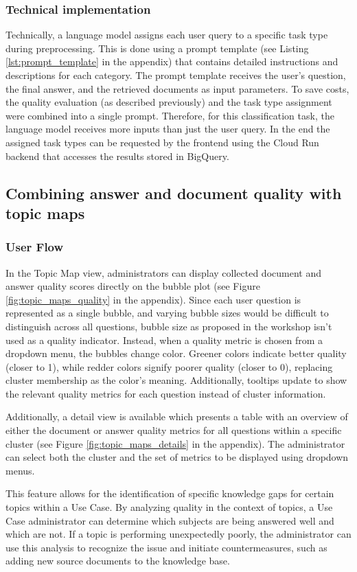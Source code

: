 \documentclass[
	english,
	ruledheaders=section,%
	class=report,%
	thesis={type=bachelor},%
	accentcolor=1b,%
	custommargins=true,%
	marginpar=false,%
	parskip=half-,%
	fontsize=11pt,%
	DIV=14,
]{tudapub}
\begin{document}
\subsubsection{Technical implementation}
Technically, a language model assigns each user query to a specific task type during preprocessing. This is done using a prompt template (see Listing \ref{lst:prompt_template} in the appendix) that contains detailed instructions and descriptions for each category. The prompt template receives the user's question, the final answer, and the retrieved documents as input parameters. To save costs, the quality evaluation (as described previously) and the task type assignment were combined into a single prompt. Therefore, for this classification task, the language model receives more inputs than just the user query. In the end the assigned task types can be requested by the frontend using the Cloud Run backend that accesses the results stored in BigQuery.
\subsection{Combining answer and document quality with topic maps}
\subsubsection{User Flow}
In the Topic Map view, administrators can display collected document and answer quality scores directly on the bubble plot (see Figure \ref{fig:topic_maps_quality} in the appendix). Since each user question is represented as a single bubble, and varying bubble sizes would be difficult to distinguish across all questions, bubble size as proposed in the workshop isn't used as a quality indicator. Instead, when a quality metric is chosen from a dropdown menu, the bubbles change color. Greener colors indicate better quality (closer to 1), while redder colors signify poorer quality (closer to 0), replacing cluster membership as the color's meaning. Additionally, tooltips update to show the relevant quality metrics for each question instead of cluster information.

Additionally, a detail view is available which presents a table with an overview of either the document or answer quality metrics for all questions within a specific cluster (see Figure  \ref{fig:topic_maps_details} in the appendix). The administrator can select both the cluster and the set of metrics to be displayed using dropdown menus.

This feature allows for the identification of specific knowledge gaps for certain topics within a Use Case. By analyzing quality in the context of topics, a Use Case administrator can determine which subjects are being answered well and which are not. If a topic is performing unexpectedly poorly, the administrator can use this analysis to recognize the issue and initiate countermeasures, such as adding new source documents to the knowledge base.
\end{document}
